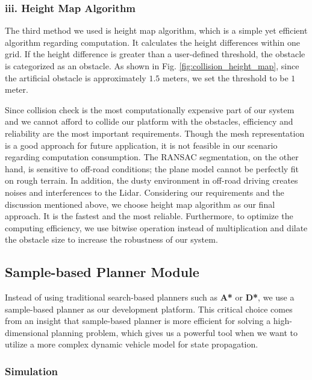 \documentclass[../thesis.tex]{subfiles}
\begin{document}
\subsubsection{iii. Height Map Algorithm}
The third method we used is height map algorithm, which is a simple yet efficient algorithm regarding computation. 
It calculates the height differences within one grid. If the height difference is greater than a user-defined threshold, the obstacle is categorized as an obstacle. 
As shown in Fig. \ref{fig:collision_height_map}, since the artificial obstacle is approximately $1.5$ meters, we set the threshold to be $1$ meter. 
 
 
Since collision check is the most computationally expensive part of our system and we cannot afford to collide our platform with the obstacles, efficiency and reliability are the most important requirements. 
Though the mesh representation is a good approach for future application, it is not feasible in our scenario regarding computation consumption. 
The RANSAC segmentation, on the other hand, is sensitive to off-road conditions; the plane model cannot be perfectly fit on rough terrain. 
In addition, the dusty environment in off-road driving creates noises and interferences to the Lidar. 
Considering our requirements and the discussion mentioned above, we choose height map algorithm as our final approach. 
It is the fastest and the most reliable. 
Furthermore, to optimize the computing efficiency, we use bitwise operation instead of multiplication and dilate the obstacle size to increase the robustness of our system.
 
\subsection{Sample-based Planner Module}
 
Instead of using traditional search-based planners such as \textbf{A*} or \textbf{D*}, we use a sample-based planner as our development platform. 
This critical choice comes from an insight that sample-based planner is more efficient for solving a high-dimensional planning problem, which gives us a powerful tool when we want to utilize a more complex dynamic vehicle model for state propagation.
 
\subsubsection{Simulation}
 
\end{document}
